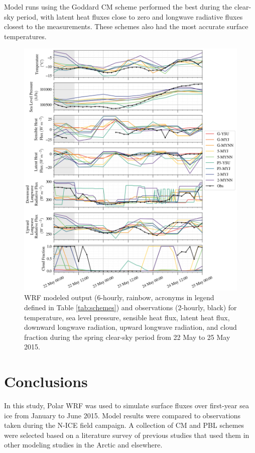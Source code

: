Model runs using the Goddard CM scheme performed the best during the clear-sky period, with latent heat fluxes close to zero and longwave radiative fluxes closest to the measurements. These schemes also had the most accurate surface temperatures.

\begin{figure}[p]
    \centering
    \includegraphics[width=1\linewidth]{figures/chapter3/wrf_case2.png}
    \caption[Polar WRF Case 3 - Spring clear-sky (23 May 2015) timeseries]{
    WRF modeled output (6-hourly, rainbow, acronyms in legend defined in Table \ref{tab:schemes}) and observations (2-hourly, black) for temperature, sea level pressure, sensible heat flux, latent heat flux, downward longwave radiation, upward longwave radiation, and cloud fraction during the spring clear-sky period from 22 May to 25 May 2015.}
    \label{fig:wrf_case2}
\end{figure}

\section{Conclusions}

In this study, Polar WRF was used to simulate surface fluxes over first-year sea ice from January to June 2015. Model results were compared to observations taken during the N-ICE field campaign. A collection of CM and PBL schemes were selected based on a literature survey of previous studies that used them in other modeling studies in the Arctic and elsewhere. 

